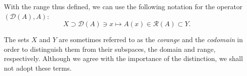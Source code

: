 With the range thus defined, we can use the following notation for the operator $(\mathcal{D}(A),A)$:\[X\supset\mathcal{D}(A)\ni x\mapsto A(x)\in\mathcal{R}(A)\subset Y.\]

The sets $X$ and $Y$ are sometimes referred to as the \emph{corange} and the \emph{codomain} in order to distinguish them from their subspaces, the domain and range, respectively. Although we agree with the importance of the distinction, we shall not adopt these terms.
